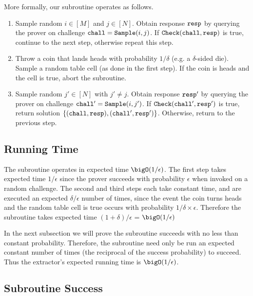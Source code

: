 More formally, our subroutine operates as follows.
\begin{enumerate}
    \item
    Sample random $i\in[M]$ and $j\in[N]$.
    Obtain response $\mathtt{resp}$ by querying the prover on challenge $\mathtt{chall}=\mathtt{Sample}(i,j)$.
    If $\mathtt{Check}(\mathtt{chall},\mathtt{resp})$ is true, continue to the next step, otherwise repeat this step.

    \item
    Throw a coin that lands heads with probability $1/\delta$ (e.g. a $\delta$-sided die).
    Sample a random table cell (as done in the first step).
    If the coin is heads and the cell is true, abort the subroutine.

    \item
    Sample random $j'\in[N]$ with $j'\neq j$.
    Obtain response $\mathtt{resp}'$ by querying the prover on challenge $\mathtt{chall}'=\mathtt{Sample}(i,j')$.
    If $\mathtt{Check}(\mathtt{chall}',\mathtt{resp}')$ is true, return solution $\{(\mathtt{chall},\mathtt{resp}),(\mathtt{chall}',\mathtt{resp}')\}$.
    Otherwise, return to the previous step.
\end{enumerate}


\subsection{Running Time}

The subroutine operates in expected time $\bigO(1/\epsilon)$.
The first step takes expected time $1/\epsilon$ since the prover succeeds with probability $\epsilon$ when invoked on a random challenge. 
The second and third steps each take constant time, and are executed an expected $\delta/\epsilon$ number of times, since the event the coin turns heads and the random table cell is true occurs with probability $1/\delta\times\epsilon$.
Therefore the subroutine takes expected time $(1+\delta)/\epsilon$ = $\bigO(1/\epsilon)$

In the next subsection we will prove the subroutine succeeds with no less than constant probability.
Therefore, the subroutine need only be run an expected constant number of times (the reciprocal of the success probability) to succeed.
Thus the extractor's expected running time is $\bigO(1/\epsilon)$.


\subsection{Subroutine Success}

